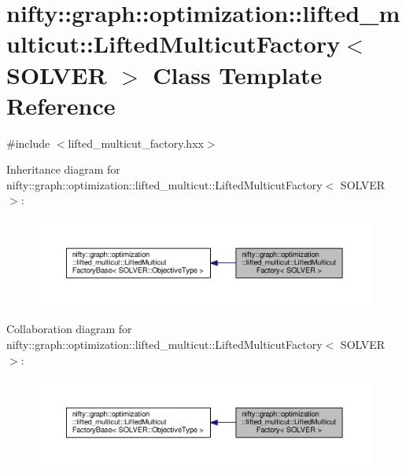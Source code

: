 \hypertarget{classnifty_1_1graph_1_1optimization_1_1lifted__multicut_1_1LiftedMulticutFactory}{}\section{nifty\+:\+:graph\+:\+:optimization\+:\+:lifted\+\_\+multicut\+:\+:Lifted\+Multicut\+Factory$<$ S\+O\+L\+V\+E\+R $>$ Class Template Reference}
\label{classnifty_1_1graph_1_1optimization_1_1lifted__multicut_1_1LiftedMulticutFactory}


{\ttfamily \#include $<$lifted\+\_\+multicut\+\_\+factory.\+hxx$>$}



Inheritance diagram for nifty\+:\+:graph\+:\+:optimization\+:\+:lifted\+\_\+multicut\+:\+:Lifted\+Multicut\+Factory$<$ S\+O\+L\+V\+E\+R $>$\+:\nopagebreak
\begin{figure}[H]
\begin{center}
\leavevmode
\includegraphics[width=350pt]{classnifty_1_1graph_1_1optimization_1_1lifted__multicut_1_1LiftedMulticutFactory__inherit__graph}
\end{center}
\end{figure}


Collaboration diagram for nifty\+:\+:graph\+:\+:optimization\+:\+:lifted\+\_\+multicut\+:\+:Lifted\+Multicut\+Factory$<$ S\+O\+L\+V\+E\+R $>$\+:\nopagebreak
\begin{figure}[H]
\begin{center}
\leavevmode
\includegraphics[width=350pt]{classnifty_1_1graph_1_1optimization_1_1lifted__multicut_1_1LiftedMulticutFactory__coll__graph}
\end{center}
\end{figure}
